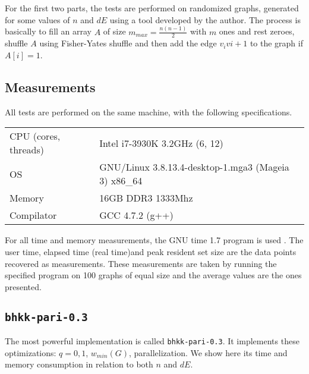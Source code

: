 \documentclass[a4paper]{article}
\newcommand{\code}{\texttt}
\begin{document}
For the first two parts, the tests are performed on randomized graphs, generated for some values of $n$ and $dE$ using a tool developed by the author. The process is basically to fill an array $A$ of size $m_{max} = \frac{n(n-1)}{2}$ with $m$ ones and rest zeroes, shuffle $A$ using Fisher-Yates shuffle and then add the edge $v_iv{i+1}$ to the graph if $A[i] = 1$.

\subsection{Measurements}
All tests are performed on the same machine, with the following specifications.

\begin{center}
\begin{tabular}{l|l}
CPU (cores, threads) & Intel i7-3930K 3.2GHz (6, 12) \\ 
OS & GNU/Linux 3.8.13.4-desktop-1.mga3 (Mageia 3) x86\_64 \\ 
Memory & 16GB DDR3 1333Mhz \\ 
Compilator & GCC 4.7.2 (g++) \\ 
\end{tabular}
\end{center}

For all time and memory measurements, the GNU time 1.7 program is used \cite{time}. The user time, elapsed time (real time)\footnotemark and peak resident set size are the data points recovered as measurements. These measurements are taken by running the specified program on 100 graphs of equal size and the average values are the ones presented.


\subsection{\code{bhkk-pari-0.3}}
The most powerful implementation is called \code{bhkk-pari-0.3}. It implements these optimizations: $q = 0, 1$, $w_{min}(G)$, parallelization. We show here its time and memory consumption in relation to both $n$ and $dE$.
\end{document}
